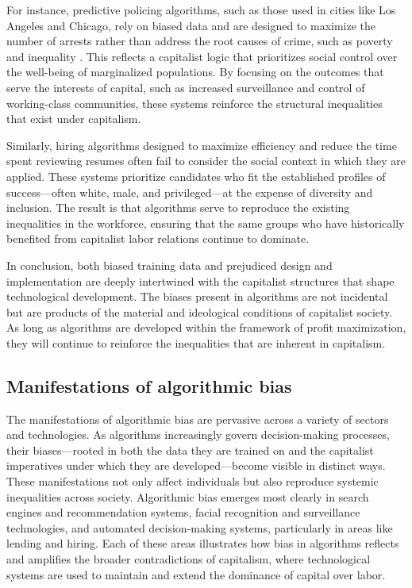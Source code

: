 \begin{refsection}
For instance, predictive policing algorithms, such as those used in cities like Los Angeles and Chicago, rely on biased data and are designed to maximize the number of arrests rather than address the root causes of crime, such as poverty and inequality \cite[pp.~45-48]{benjamin2019}. This reflects a capitalist logic that prioritizes social control over the well-being of marginalized populations. By focusing on the outcomes that serve the interests of capital, such as increased surveillance and control of working-class communities, these systems reinforce the structural inequalities that exist under capitalism.

Similarly, hiring algorithms designed to maximize efficiency and reduce the time spent reviewing resumes often fail to consider the social context in which they are applied. These systems prioritize candidates who fit the established profiles of success—often white, male, and privileged—at the expense of diversity and inclusion. The result is that algorithms serve to reproduce the existing inequalities in the workforce, ensuring that the same groups who have historically benefited from capitalist labor relations continue to dominate.

In conclusion, both biased training data and prejudiced design and implementation are deeply intertwined with the capitalist structures that shape technological development. The biases present in algorithms are not incidental but are products of the material and ideological conditions of capitalist society. As long as algorithms are developed within the framework of profit maximization, they will continue to reinforce the inequalities that are inherent in capitalism.

\subsection{Manifestations of algorithmic bias}

The manifestations of algorithmic bias are pervasive across a variety of sectors and technologies. As algorithms increasingly govern decision-making processes, their biases—rooted in both the data they are trained on and the capitalist imperatives under which they are developed—become visible in distinct ways. These manifestations not only affect individuals but also reproduce systemic inequalities across society. Algorithmic bias emerges most clearly in search engines and recommendation systems, facial recognition and surveillance technologies, and automated decision-making systems, particularly in areas like lending and hiring. Each of these areas illustrates how bias in algorithms reflects and amplifies the broader contradictions of capitalism, where technological systems are used to maintain and extend the dominance of capital over labor.


\end{refsection}
